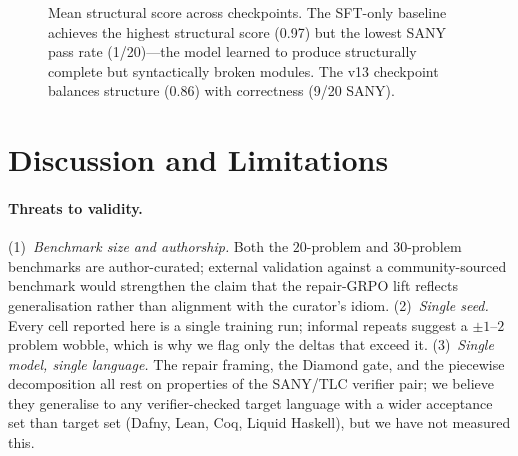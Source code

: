 \documentclass[11pt]{article}
\begin{document}
\begin{figure}[t]
\centering
{}
\caption{Mean structural score across checkpoints.  The SFT-only
baseline achieves the highest structural score (0.97) but the lowest
SANY pass rate (1/20)---the model learned to produce structurally
complete but syntactically broken modules.  The v13 checkpoint balances
structure (0.86) with correctness (9/20 SANY).}
\label{fig:structural}
\end{figure}

\section{Discussion and Limitations}
\label{sec:discussion}

\paragraph{Threats to validity.} (1)~\emph{Benchmark size and
authorship.} Both the $20$-problem and $30$-problem benchmarks are
author-curated; external validation against a community-sourced
benchmark would strengthen the claim that the repair-GRPO lift
reflects generalisation rather than alignment with the curator's
idiom. (2)~\emph{Single seed.} Every cell reported here is a single
training run; informal repeats suggest a $\pm 1$--$2$ problem
wobble, which is why we flag only the deltas that exceed
it. (3)~\emph{Single model, single language.} The repair framing,
the Diamond gate, and the piecewise decomposition all rest on
properties of the SANY/TLC verifier pair; we believe they generalise
to any verifier-checked target language with a wider acceptance set
than target set (Dafny, Lean, Coq, Liquid Haskell), but we have not
measured this.
\end{document}
